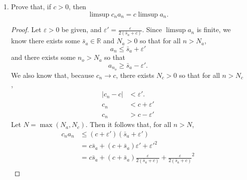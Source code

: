 \documentclass{article}
\begin{document}
\begin{enumerate}
\begin{enumerate}
                  \item Prove that, if $c>0$, then
                        \begin{equation}
                              \limsup c_na_n = c\limsup a_n.
                              \label{eq:6.1_5_given}
                        \end{equation}
                        \begin{proof}
                              Let $\varepsilon>0$ be given, and
                              $\varepsilon'=\frac{\varepsilon}{2\left(\bar s_a + c\right)}$.
                              Since $\limsup a_n$ is finite, we know there exists
                              some $\bar s_a\in \mathbb{R}$ and $N_a>0$ so that for all $n>N_a$,
                              \[
                                    a_n \leq \bar s_a + \varepsilon'
                              \]
                              and there exists some $n_o>N_a$ so that
                              \[
                                    a_{n_o} \geq \bar s_a - \varepsilon'.
                              \]
                              We also know that, because $c_n\to c$, there exists
                              $N_c>0$ so that for all $n>N_c$,
                              \begin{align*}
                                    \lvert c_n-c\rvert & < \varepsilon'.    \\
                                    c_n                & < c + \varepsilon' \\
                                    c_n                & > c - \varepsilon'
                              \end{align*}
                              Let $N=\max(N_a, N_c)$. Then it follows that, for all
                              $n>N$,
                              \begin{align*}
                                    c_na_n & \leq \left(c + \varepsilon'\right)\left(\bar s_a + \varepsilon'\right)                                                                 \\
                                           & = c\bar s_a + \left(c+\bar s_a\right)\varepsilon' + \varepsilon'^2                                                                     \\
                                           & = c\bar s_a + \left(c+\bar s_a\right)\frac{\varepsilon}{2\left(\bar s_a + c\right)} + \frac{\varepsilon}{2\left(\bar s_a + c\right)}^2 \\

\end{align*}
\end{proof}
\end{enumerate}
\end{enumerate}
\end{document}
